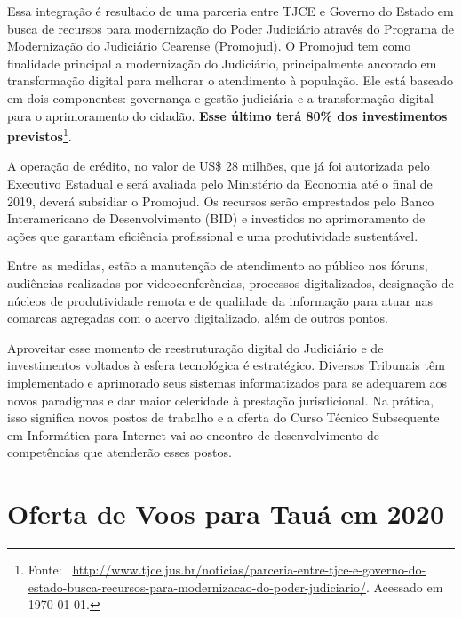 \documentclass[
	12pt,				%
	openright,			%
	twoside,			%
	a4paper,			%
	chapter=TITLE,		%
	english,			%
	french,				%
	spanish,			%
	brazil,				%
	]{abntex2}
\begin{document}


Essa integração é resultado de uma parceria entre TJCE e Governo do Estado em busca de recursos para modernização do Poder Judiciário através do Programa de Modernização do Judiciário Cearense (Promojud). O Promojud tem como finalidade principal a modernização do Judiciário, principalmente ancorado em transformação digital para melhorar o atendimento à população. Ele está baseado em dois componentes: governança e gestão judiciária e a transformação digital para o aprimoramento do cidadão. \textbf{Esse último terá 80\% dos investimentos previstos}\footnote{Fonte:~
\href{https://www.tjce.jus.br/noticias/parceria-entre-tjce-e-governo-do-estado-busca-recursos-para-modernizacao-do-poder-judiciario/}{http://www.tjce.jus.br/noticias/parceria-entre-tjce-e-governo-do-estado-busca-recursos-para-modernizacao-do-poder-judiciario/}. Acessado em \today.}.


A operação de crédito,  no valor de US\$ 28 milhões, que já foi autorizada pelo Executivo Estadual e será avaliada pelo Ministério da Economia até o final de 2019, deverá subsidiar o Promojud. Os recursos serão emprestados pelo Banco Interamericano de Desenvolvimento (BID) e investidos no aprimoramento de ações que garantam eficiência profissional e uma produtividade sustentável. 



Entre as medidas, estão a manutenção de atendimento ao público nos fóruns, audiências realizadas por videoconferências, processos digitalizados, designação de núcleos de produtividade remota e de qualidade da informação para atuar nas comarcas agregadas com o acervo digitalizado, além de outros pontos. 


Aproveitar esse momento de reestruturação digital do Judiciário e de investimentos voltados à esfera tecnológica é estratégico. Diversos Tribunais t\^em implementado e aprimorado seus sistemas informatizados para se adequarem aos novos paradigmas e dar maior celeridade à prestação jurisdicional. Na prática, isso significa novos postos de trabalho e a oferta do Curso Técnico Subsequente em Informática para Internet vai ao encontro de desenvolvimento de competências que atenderão esses postos.



\section{Oferta de Voos para Tau\'a em 2020}
\end{document}
